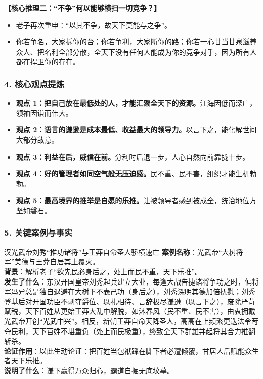 \noindent\textbf{【核心推理二：“不争”何以能够横扫一切竞争？】}
\begin{itemize}
    \item 老子再次重申：“以其不争，故天下莫能与之争”。
    \item 你若争名，大家拆你的台；你若争利，大家断你的路；你若一心甘当甘泉滋养众人、把名利全部分散，全天下没有任何人能成为你的竞争对手，因为所有人都在捍卫你的存在。
\end{itemize}

\subsubsection{4. 核心观点提炼}
\begin{itemize}
    \item \textbf{观点 1：把自己放在最低处的人，才能汇聚全天下的资源。}江海因低而深广，领袖因谦而伟大。
    \item \textbf{观点 2：语言的谦逊是成本最低、收益最大的领导力。}以言下之，能化解世间大部分敌意。
    \item \textbf{观点 3：利益在后，威信在前。}分利时后退一步，人心自然向前靠拢十步。
    \item \textbf{观点 4：好的管理者如同空气般无压迫感。}民不重、民不害，组织才能生机勃勃。
    \item \textbf{观点 5：最高境界的推举是自愿的乐推。}让被领导者感到被成全，统治地位方坚如磐石。
\end{itemize}

\subsubsection{5. 关键案例与事实}
\begin{CaseBox}{汉光武帝刘秀“推功诸将”与王莽自命圣人骄横速亡}
\textbf{案例名称}：光武帝“大树将军”美德与王莽自居其上覆灭。\\
\textbf{背景}：解析老子“欲先民必身后之，处上而民不重，天下乐推”。\\
\textbf{发生了什么}：东汉开国皇帝刘秀起兵建立大业，每逢大战告捷诸将争功之时，偏将军冯异总是独自退避在大树下不表己功（身后之），刘秀深明其德加倍抚慰；刘秀登基后对开国功臣不剥夺爵位、以礼相待、言辞极尽谦逊（以言下之），废除严苛赋税，天下百姓从更始王莽大乱中解脱，如沐春风（民不重、民不害），由衷拥戴光武帝开创“光武中兴”。相反，新朝王莽自命天降圣人，高高在上频繁更迭法令苛夺民利，天下百姓不堪重负（处上而民极重），终致全天下群雄并起将其合力推翻斩杀。\\
\textbf{论证作用}：以此生动论证：把百姓当包袱踩在脚下者必遭倾覆，甘居人后赋能众生者天下乐推。\\
\textbf{说明了什么}：谦下赢得万众归心，霸道自掘无底坟墓。
\end{CaseBox}

